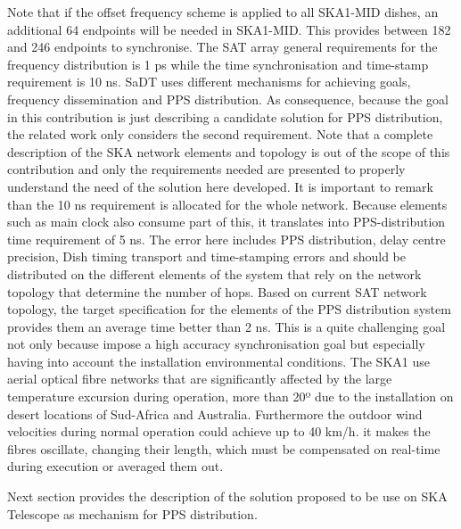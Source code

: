 Note that if the offset frequency scheme is applied to all SKA1-MID dishes, an
additional 64 endpoints will be needed in SKA1-MID. This provides between 182
and 246 endpoints to synchronise.  The SAT array general requirements for the
frequency distribution is 1 ps while the time synchronisation and time-stamp
requirement is 10 ns. SaDT uses different mechanisms for achieving goals,
frequency dissemination and PPS distribution. As consequence, because the goal
in this contribution is just describing a  candidate solution for PPS
distribution, the related work only considers the second requirement. Note that
a complete description of the SKA network elements and topology is out of the
scope of this contribution and only the requirements needed are presented to
properly understand the need of the solution here developed.  It is important
to remark than the 10 ns requirement is allocated for the whole network.
Because elements such as main clock also consume part of this, it translates
into PPS-distribution time requirement of 5 ns. The error here includes PPS
distribution, delay centre precision, Dish timing transport and time-stamping
errors and should be distributed on the different elements of the system that
rely on the network topology that determine the number of hops.  Based on
current SAT network topology, the target specification for the elements of the
PPS distribution system provides them an average time better than 2 ns. This is
a quite challenging goal not only because impose a high accuracy
synchronisation goal but especially having into account the installation
environmental conditions. The SKA1 use aerial optical fibre networks that are
significantly affected by the large temperature excursion during operation,
more than 20º due to the installation on desert locations of Sud-Africa and
Australia. Furthermore the outdoor wind velocities during normal operation
could achieve up to 40 km/h. it makes the fibres oscillate, changing their
length, which must be compensated on real-time during execution or averaged
them out. 

Next section provides the description of the solution proposed to be use on SKA
Telescope as mechanism for PPS distribution. 


